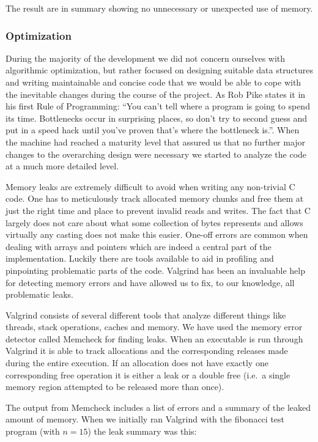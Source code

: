 The result are in summary showing no unnecessary or unexpected use of memory.

\subsubsection{Optimization}

During the majority of the development we did not concern ourselves with
algorithmic optimization, but rather focused on designing suitable data
structures and writing maintainable and concise code that we would be able to
cope with the inevitable changes during the course of the project. As Rob Pike
states it in his first Rule of Programming: ``You can't tell where a program is
going to spend its time. Bottlenecks occur in surprising places, so don't try to
second guess and put in a speed hack until you've proven that's where the
bottleneck is.''\cite{pike-rules}. When the machine had reached a maturity level
that assured us that no further major changes to the overarching design were
necessary we started to analyze the code at a much more detailed level.

Memory leaks are extremely difficult to avoid when writing any non-trivial C
code. One has to meticulously track allocated memory chunks and free them at
just the right time and place to prevent invalid reads and writes. The fact that
C largely does not care about what some collection of bytes represents and
allows virtually any casting does not make this easier. One-off errors are
common when dealing with arrays and pointers which are indeed a central part of
the \thename{} implementation. Luckily there are tools available to aid in
profiling and pinpointing problematic parts of the code. Valgrind has been an
invaluable help for detecting memory errors and have allowed us to fix, to our
knowledge, all problematic leaks.

Valgrind consists of several different tools that analyze different things like
threads, stack operations, caches and memory. We have used the memory error
detector called Memcheck for finding leaks. When an executable is run through
Valgrind it is able to track allocations and the corresponding releases made
during the entire execution. If an allocation does not have exactly one
corresponding free operation it is either a leak or a double free (i.e.~a single
memory region attempted to be released more than once).

The output from Memcheck includes a list of errors and a summary of the leaked
amount of memory. When we initially ran Valgrind with the fibonacci test program
(with $n=15$) the leak summary was this:

